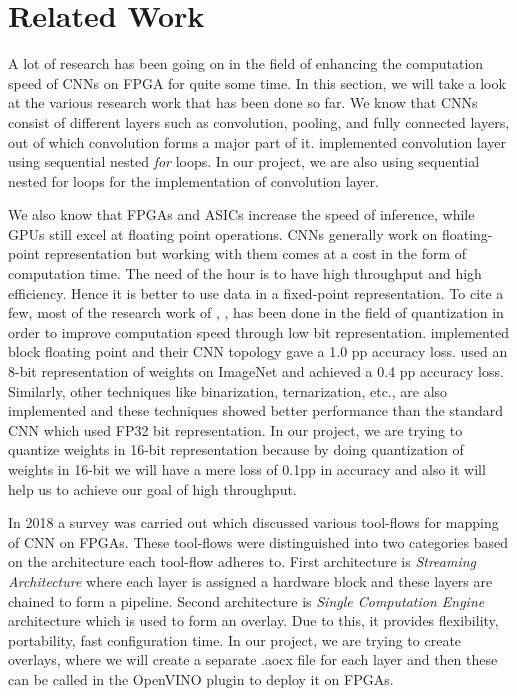 \chapter{Related Work}
A lot of research has been going on in the field of enhancing the computation speed of CNNs on FPGA for quite some time. In this section, we will take a look at the various research work that has been done so far. We know that CNNs consist of different layers such as convolution, pooling, and fully connected layers, out of which convolution forms a major part of it. \cite{DBLP:conf/iccv/LiuLSHYZ17} implemented convolution layer using sequential nested \textit{for} loops. In our project, we are also using sequential nested for loops for the implementation of convolution layer.

We also know that FPGAs and ASICs increase the speed of inference, while GPUs still excel at floating point operations. CNNs generally work on floating-point representation but working with them comes at a cost in the form of computation time. The need of the hour is to have high throughput and high efficiency. Hence it is better to use data in a fixed-point representation. To cite a few, most of the research work of \cite{DBLP:journals/corr/abs-1712-05877}, \cite{DBLP:conf/fpga/QiuWYGLZYTXSWY16}, \cite{DBLP:conf/icassp/ShinHS16} has been done in the field of quantization in order to improve computation speed through low bit representation. \cite{DBLP:journals/corr/CourbariauxBD14} implemented block floating point and their CNN topology gave a 1.0 pp accuracy loss. \cite{DBLP:conf/fpga/QiuWYGLZYTXSWY16} used an 8-bit representation of weights on ImageNet and achieved a 0.4 pp accuracy loss. Similarly, other techniques like binarization, ternarization, etc., are also implemented and these techniques showed better performance than the standard CNN which used FP32 bit representation. In our project, we are trying to quantize weights in 16-bit representation because by doing quantization of weights in 16-bit we will have a mere loss of 0.1pp in accuracy and also it will help us to achieve our goal of high throughput.

In 2018 a survey was carried out which discussed various tool-flows for mapping of CNN on FPGAs. These tool-flows were distinguished into two categories based on the architecture each tool-flow adheres to. First architecture is \textit{Streaming Architecture} where each layer is assigned a hardware block and these layers are chained to form a pipeline\cite{DBLP:journals/tnn/DundarJMC17}. Second architecture is \textit{Single Computation Engine} architecture which is used to form an overlay. Due to this, it provides flexibility, portability, fast configuration time. In our project, we are trying to create overlays, where we will create a separate .aocx file for each layer and then these can be called in the OpenVINO plugin to deploy it on FPGAs.

